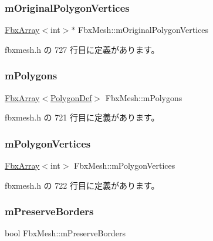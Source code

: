 \subsubsection{\texorpdfstring{m\+Original\+Polygon\+Vertices}{mOriginalPolygonVertices}}
{\footnotesize\ttfamily \hyperlink{class_fbx_array}{Fbx\+Array}$<$int$>$$\ast$ Fbx\+Mesh\+::m\+Original\+Polygon\+Vertices}



 fbxmesh.\+h の 727 行目に定義があります。

\mbox{\label{class_fbx_mesh_a61a2707539a87a8637353b6dccbb9782}} 
\subsubsection{\texorpdfstring{m\+Polygons}{mPolygons}}
{\footnotesize\ttfamily \hyperlink{class_fbx_array}{Fbx\+Array}$<$\hyperlink{struct_fbx_mesh_1_1_polygon_def}{Polygon\+Def}$>$ Fbx\+Mesh\+::m\+Polygons}



 fbxmesh.\+h の 721 行目に定義があります。

\mbox{\label{class_fbx_mesh_a61068fac65d5a770ebf815fd24772a99}} 
\subsubsection{\texorpdfstring{m\+Polygon\+Vertices}{mPolygonVertices}}
{\footnotesize\ttfamily \hyperlink{class_fbx_array}{Fbx\+Array}$<$int$>$ Fbx\+Mesh\+::m\+Polygon\+Vertices}



 fbxmesh.\+h の 722 行目に定義があります。

\mbox{\label{class_fbx_mesh_a05de09199525ca131c28f4f8eed8260e}} 
\subsubsection{\texorpdfstring{m\+Preserve\+Borders}{mPreserveBorders}}
{\footnotesize\ttfamily bool Fbx\+Mesh\+::m\+Preserve\+Borders\hspace{0.3cm}{\ttfamily [protected]}}



